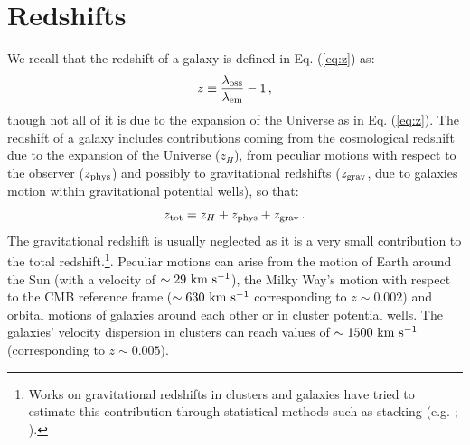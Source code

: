 \section{Redshifts}
We recall that the redshift of a galaxy is defined in Eq. (\ref{eq:z}) as:
\begin{equation}
z\equiv \frac{\lambda_{\rm oss}}{\lambda_{\rm em}}-1\, ,
\end{equation}
though not all of it is due to the expansion of the Universe as in Eq. (\ref{eq:z}). The redshift of a galaxy includes contributions coming from the cosmological redshift due to the expansion of the Universe ($z_H$), from peculiar motions with respect to the observer ($z_{\rm phys}$) and possibly to gravitational redshifts ($z_{\rm grav}$, due to galaxies motion within gravitational potential wells), so that:
\begin{equation}
z_{\rm tot} = z_H+z_{\rm phys}+z_{\rm grav}\,.
\end{equation}
The gravitational redshift is usually neglected as it is a very small contribution to the total redshift.\footnote{Works on gravitational redshifts in clusters and galaxies have tried to estimate this contribution through statistical methods such as stacking (e.g. \citealt{wojtak}; \citealt{sadeh15}).}. Peculiar motions can arise from the motion of Earth around the Sun (with a velocity of $\sim 29~{\rm km~s^{-1}}$), the Milky Way's motion with respect to the CMB reference frame ($\sim 630 ~{\rm km~s^{-1}}$ corresponding to $z \sim 0.002$) and orbital motions of galaxies around each other or in cluster potential wells. The galaxies' velocity dispersion in clusters can reach values of $\sim 1500 ~{\rm km~s^{-1}}$ (corresponding to $z\sim 0.005$).

